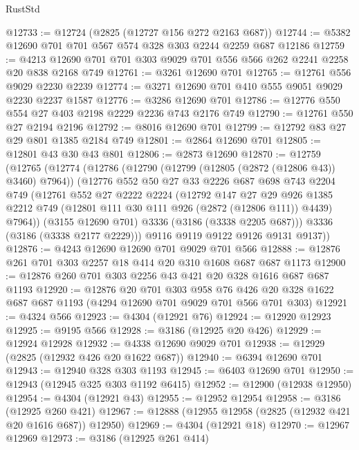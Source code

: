 \begin{lexlean}{RustStd}
\begin{coremodule}
{\begin{coremodule}
{{{{{{{{{{{{{{{{{{{{@12733 := @12724 (@2825 (@12727 @156 @272 @2163 @687))
@12744 := @5382 @12690 @701 @701 @567 @574 @328 @303 @2244 @2259 @687 @12186
@12759 := @4213 @12690 @701 @701 @303 @9029 @701 @556 @566 @262 @2241 @2258 @20 @838 @2168 @749
@12761 := @3261 @12690 @701
@12765 := @12761 @556 @9029 @2230 @2239
@12774 := @3271 @12690 @701 @410 @555 @9051 @9029 @2230 @2237 @1587
@12776 := @3286 @12690 @701
@12786 := @12776 @550 @554 @27 @403 @2198 @2229 @2236 @743 @2176 @749
@12790 := @12761 @550 @27 @2194 @2196
@12792 := @8016 @12690 @701
@12799 := @12792 @83 @27 @29 @801 @1385 @2184 @749
@12801 := @2864 @12690 @701
@12805 := @12801 @43 @30 @43 @801
@12806 := @2873 @12690
@12870 := @12759
    (@12765
      (@12774
        (@12786
          (@12790 (@12799 (@12805 (@2872 (@12806 @43)) @3460) @7964))
          (@12776
            @552
            @50
            @27
            @33
            @2226
            @687
            @698
            @743
            @2204
            @749
            (@12761
              @552
              @27
              @2222
              @2224
              (@12792
                @147
                @27
                @29
                @926
                @1385
                @2212
                @749
                (@12801 @111 @30 @111 @926 (@2872 (@12806 @111)) @4439)
                @7964))
            (@3155 @12690 @701)
            @3336
            (@3186 (@3338 @2205 @687)))
          @3336
          (@3186 (@3338 @2177 @2229)))
        @9116
        @9119
        @9122
        @9126
        @9131
        @9137))
@12876 := @4243 @12690 @12690 @701 @9029 @701 @566
@12888 := @12876 @261 @701 @303 @2257 @18 @414 @20 @310 @1608 @687 @687 @1173
@12900 := @12876 @260 @701 @303 @2256 @43 @421 @20 @328 @1616 @687 @687 @1193
@12920 := @12876
    @20
    @701
    @303
    @958
    @76
    @426
    @20
    @328
    @1622
    @687
    @687
    @1193
    (@4294 @12690 @701 @9029 @701 @566 @701 @303)
@12921 := @4324 @566
@12923 := @4304 (@12921 @76)
@12924 := @12920 @12923
@12925 := @9195 @566
@12928 := @3186 (@12925 @20 @426)
@12929 := @12924 @12928
@12932 := @4338 @12690 @9029 @701
@12938 := @12929 (@2825 (@12932 @426 @20 @1622 @687))
@12940 := @6394 @12690 @701
@12943 := @12940 @328 @303 @1193
@12945 := @6403 @12690 @701
@12950 := @12943 (@12945 @325 @303 @1192 @6415)
@12952 := @12900 (@12938 @12950)
@12954 := @4304 (@12921 @43)
@12955 := @12952 @12954
@12958 := @3186 (@12925 @260 @421)
@12967 := @12888 (@12955 @12958 (@2825 (@12932 @421 @20 @1616 @687)) @12950)
@12969 := @4304 (@12921 @18)
@12970 := @12967 @12969
@12973 := @3186 (@12925 @261 @414)
}}}}}}}}}}}}}}}}}}}}
\end{coremodule}}
\end{coremodule}
\end{lexlean}
